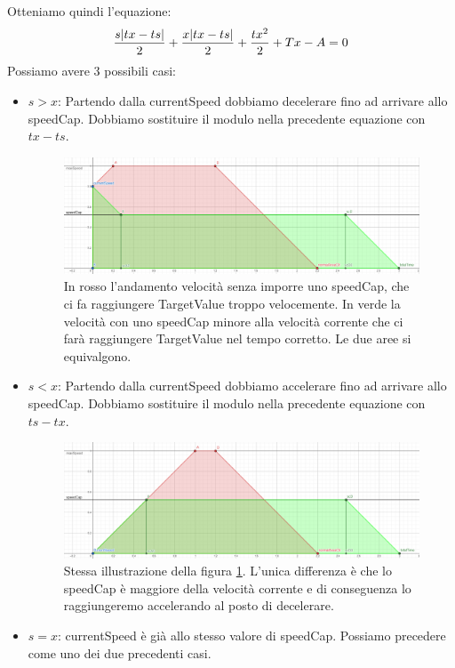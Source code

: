 \documentclass[main.tex]{subfiles}
\begin{document}
Otteniamo quindi l'equazione:
\[\frac{s\abs{tx - ts}}{2} + \frac{x\abs{tx - ts}}{2} + \frac{tx^2}{2} + Tx - A = 0\]
Possiamo avere 3 possibili casi:\newline
\begin{itemize}
    \item $s > x$: Partendo dalla currentSpeed dobbiamo decelerare fino ad arrivare allo speedCap. Dobbiamo sostituire il modulo nella precedente equazione con $tx - ts$.
    \begin{figure}[H]
        \centering
        \includegraphics[width=.8\linewidth]{img/interpolazione/speedCapCalcGE.png}
        \caption{In rosso l'andamento velocità senza imporre uno speedCap, che ci fa raggiungere TargetValue troppo velocemente. In verde la velocità con uno speedCap  minore alla velocità corrente che ci farà raggiungere TargetValue nel tempo corretto. Le due aree si equivalgono.}
        \label{fig:4_speedCapCalcGE}
    \end{figure}
    \item $s < x$: Partendo dalla currentSpeed dobbiamo accelerare fino ad arrivare allo speedCap. Dobbiamo sostituire il modulo nella precedente equazione con $ts - tx$.
    \begin{figure}[H]
        \centering
        \includegraphics[width=.8\linewidth]{img/interpolazione/speedCapCalcBE.png}
        \caption{Stessa illustrazione della figura \ref{fig:4_speedCapCalcGE}. L'unica differenza è che lo speedCap è maggiore della velocità corrente e di conseguenza lo raggiungeremo accelerando al posto di decelerare.}
        \label{fig:4_speedCapCalcBE}
    \end{figure}

\item $s = x$: currentSpeed è già allo stesso valore di speedCap. Possiamo precedere come uno dei due precedenti casi. \newline
\end{itemize}
\end{document}
